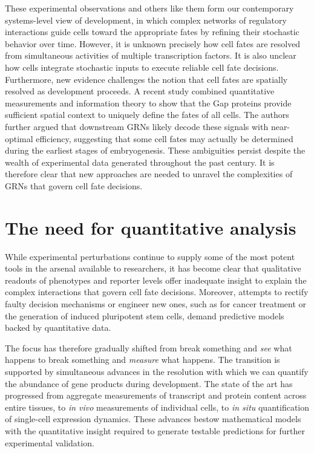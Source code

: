 These experimental observations and others like them form our contemporary systems-level view of development, in which complex networks of regulatory interactions guide cells toward the appropriate fates by refining their stochastic behavior over time. However, it is unknown precisely how cell fates are resolved from simultaneous activities of multiple transcription factors. It is also unclear how cells integrate stochastic inputs to execute reliable cell fate decisions. Furthermore, new evidence challenges the notion that cell fates are spatially resolved as development proceeds. A recent study combined quantitative measurements and information theory to show that the Gap proteins provide sufficient spatial context to uniquely define the fates of all cells. The authors further argued that downstream GRNs likely decode these signals with near-optimal efficiency, suggesting that some cell fates may actually be determined during the earliest stages of embryogenesis. These ambiguities persist despite the wealth of experimental data generated throughout the past century. It is therefore clear that new approaches are needed to unravel the complexities of GRNs that govern cell fate decisions.

\section{The need for quantitative analysis}

While experimental perturbations continue to supply some of the most potent tools in the arsenal available to researchers, it has become clear that qualitative readouts of phenotypes and reporter levels offer inadequate insight to explain the complex interactions that govern cell fate decisions. Moreover, attempts to rectify faulty decision mechanisms or engineer new ones, such as for cancer treatment or the generation of induced pluripotent stem cells, demand predictive models backed by quantitative data.

The focus has therefore gradually shifted from break something and \textit{see} what happens to break something and \textit{measure} what happens. The transition is supported by simultaneous advances in the resolution with which we can quantify the abundance of gene products during development. The state of the art has progressed from aggregate measurements of transcript and protein content across entire tissues, to \emph{in vivo} measurements of individual cells, to \emph{in situ} quantification of single-cell expression dynamics. These advances bestow mathematical models with the quantitative insight required to generate testable predictions for further experimental validation.

